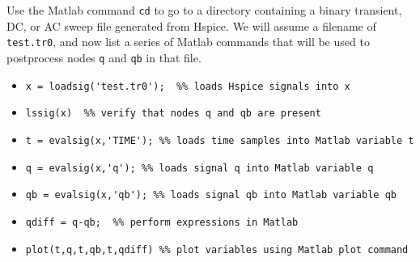 \documentclass [dvips,12pt,cite]{article}
\begin{document}
  Use the Matlab command \verb|cd| to go to a directory containing a
       binary transient, DC, or AC sweep file generated from Hspice.
       We will assume a filename of \verb|test.tr0|, and now list
       a series of Matlab commands that will be used to postprocess
       nodes \verb|q| and \verb|qb| in that file.
\begin{itemize}
  \item \verb|x = loadsig('test.tr0');  %% loads Hspice signals into x|
  \item \verb|lssig(x)  %% verify that nodes q and qb are present|
  \item \verb|t = evalsig(x,'TIME'); %% loads time samples into Matlab variable t|
  \item \verb|q = evalsig(x,'q'); %% loads signal q into Matlab variable q|
  \item \verb|qb = evalsig(x,'qb'); %% loads signal qb into Matlab variable qb|
  \item \verb|qdiff = q-qb;  %% perform expressions in Matlab|
  \item \verb|plot(t,q,t,qb,t,qdiff) %% plot variables using Matlab plot command|
\end{itemize}
\end{document}

